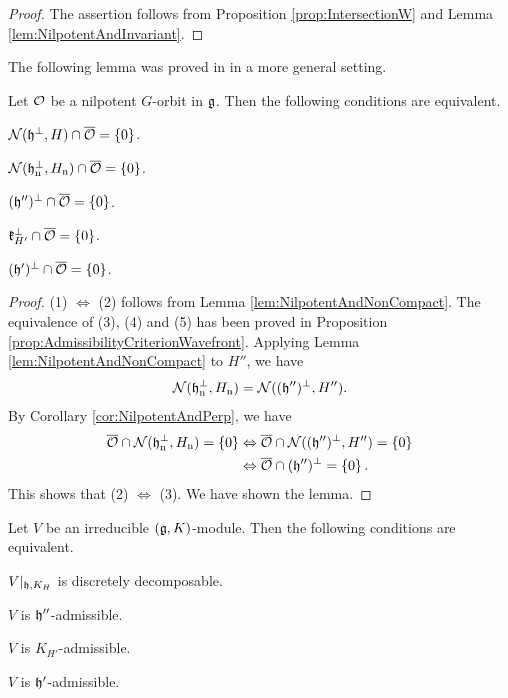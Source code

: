 \begin{proof}
	The assertion follows from Proposition \ref{prop:IntersectionW} and Lemma \ref{lem:NilpotentAndInvariant}.
\end{proof}

The following lemma was proved in \cite[Proposition 22]{Ki24} in a more general setting.

\begin{lemma} \label{lem:DiscreteDecomposabilityAndAdmissibilityWavefront}
	Let $\mathcal{O}$ be a nilpotent $G$-orbit in $\mathfrak{g}$.
	Then the following conditions are equivalent.
	\begin{enumparen}
		\item $\mathcal{N}(\mathfrak{h}^\perp, H) \cap \overline{\mathcal{O}} = \left\{0 \right\}$.
		\item $\mathcal{N}(\mathfrak{h}_{\mathrm{n}}^\perp, H_{\mathrm{n}}) \cap \overline{\mathcal{O}} = \left\{0 \right\}$.
		\item $(\mathfrak{h}'')^\perp \cap \overline{\mathcal{O}} = \left\{0 \right\}$.
		\item $\mathfrak{k}_{H'}^\perp \cap \overline{\mathcal{O}} = \left\{0 \right\}$.
		\item $(\mathfrak{h}')^\perp \cap \overline{\mathcal{O}} = \left\{0 \right\}$.
	\end{enumparen}
\end{lemma}

\begin{proof}
	(1) $\Leftrightarrow$ (2) follows from Lemma \ref{lem:NilpotentAndNonCompact}.
	The equivalence of (3), (4) and (5) has been proved in Proposition \ref{prop:AdmissibilityCriterionWavefront}.
	Applying Lemma \ref{lem:NilpotentAndNonCompact} to $H''$, we have
	\begin{align*}
		\mathcal{N}(\mathfrak{h}_{\mathrm{n}}^\perp, H_{\mathrm{n}}) = \mathcal{N}((\mathfrak{h''})^\perp, H'').
	\end{align*}
	By Corollary \ref{cor:NilpotentAndPerp}, we have
	\begin{align*}
		\overline{\mathcal{O}} \cap \mathcal{N}(\mathfrak{h}_{\mathrm{n}}^\perp, H_{\mathrm{n}}) = \left\{0 \right\}
		&\Leftrightarrow \overline{\mathcal{O}} \cap \mathcal{N}((\mathfrak{h''})^\perp, H'') = \left\{0 \right\} \\
		&\Leftrightarrow \overline{\mathcal{O}} \cap (\mathfrak{h''})^\perp = \left\{0 \right\}.
	\end{align*}
	This shows that (2) $\Leftrightarrow$ (3).
	We have shown the lemma.
\end{proof}

\begin{theorem} \label{thm:DiscretelyDecomposableAndAdmissibility}
	Let $V$ be an irreducible $(\mathfrak{g}, K)$-module.
	Then the following conditions are equivalent.
	\begin{enumparen}
		\item $V|_{\mathfrak{h}, K_H}$ is discretely decomposable.
		\item $V$ is $\mathfrak{h}''$-admissible.
		\item $V$ is $K_{H'}$-admissible.
		\item $V$ is $\mathfrak{h}'$-admissible.
	\end{enumparen}
\end{theorem}

